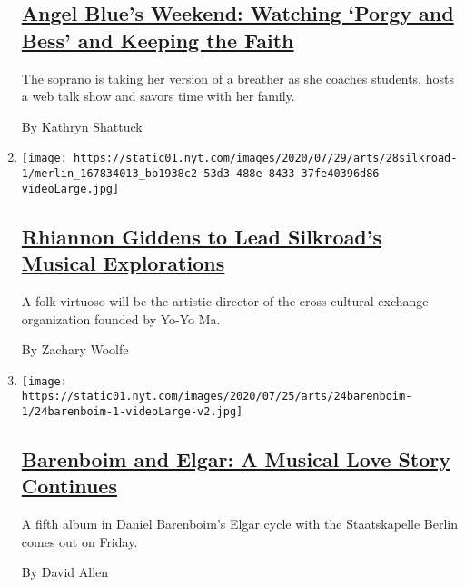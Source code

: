\begin{enumerate}
  \hypertarget{angel-blues-weekend-watching-porgy-and-bess-and-keeping-the-faith}{%
  \subsection{\texorpdfstring{\href{/2020/07/28/arts/music/angel-blue-favorites.html}{Angel
  Blue's Weekend: Watching `Porgy and Bess' and Keeping the
  Faith}}{Angel Blue's Weekend: Watching `Porgy and Bess' and Keeping the Faith}}\label{angel-blues-weekend-watching-porgy-and-bess-and-keeping-the-faith}}

  The soprano is taking her version of a breather as she coaches
  students, hosts a web talk show and savors time with her family.

  By Kathryn Shattuck
\item
  \texttt{[image: https://static01.nyt.com/images/2020/07/29/arts/28silkroad-1/merlin\_167834013\_bb1938c2-53d3-488e-8433-37fe40396d86-videoLarge.jpg]}

  \hypertarget{rhiannon-giddens-to-lead-silkroads-musical-explorations}{%
  \subsection{\texorpdfstring{\href{/2020/07/28/arts/music/rhiannon-giddens-silkroad.html}{Rhiannon
  Giddens to Lead Silkroad's Musical
  Explorations}}{Rhiannon Giddens to Lead Silkroad's Musical Explorations}}\label{rhiannon-giddens-to-lead-silkroads-musical-explorations}}

  A folk virtuoso will be the artistic director of the cross-cultural
  exchange organization founded by Yo-Yo Ma.

  By Zachary Woolfe
\item
  \texttt{[image: https://static01.nyt.com/images/2020/07/25/arts/24barenboim-1/24barenboim-1-videoLarge-v2.jpg]}

  \hypertarget{barenboim-and-elgar-a-musical-love-story-continues}{%
  \subsection{\texorpdfstring{\href{/2020/07/24/arts/music/barenboim-elgar.html}{Barenboim
  and Elgar: A Musical Love Story
  Continues}}{Barenboim and Elgar: A Musical Love Story Continues}}\label{barenboim-and-elgar-a-musical-love-story-continues}}

  A fifth album in Daniel Barenboim's Elgar cycle with the Staatskapelle
  Berlin comes out on Friday.

  By David Allen
\end{enumerate}

